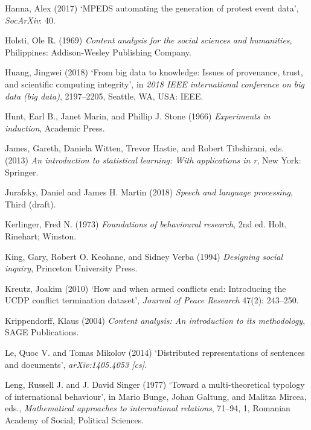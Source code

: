 \documentclass[12pt,twoside]{reedthesis}
\begin{document}
\hypertarget{ref-hanna_mpeds_2017}{}
Hanna, Alex (2017) `MPEDS automating the generation of protest event
data', \emph{SocArXiv}: 40.

\hypertarget{ref-holsti_content_1969}{}
Holsti, Ole R. (1969) \emph{Content analysis for the social sciences and
humanities}, Philippines: Addison-Wesley Publishing Company.

\hypertarget{ref-huang_big_2018}{}
Huang, Jingwei (2018) `From big data to knowledge: Issues of provenance,
trust, and scientific computing integrity', in \emph{2018 IEEE
international conference on big data (big data)}, 2197--2205, Seattle,
WA, USA: IEEE.

\hypertarget{ref-hunt_experiments_1966}{}
Hunt, Earl B., Janet Marin, and Phillip J. Stone (1966)
\emph{Experiments in induction}, Academic Press.

\hypertarget{ref-james_introduction_2013}{}
James, Gareth, Daniela Witten, Trevor Hastie, and Robert Tibshirani,
eds. (2013) \emph{An introduction to statistical learning: With
applications in r}, New York: Springer.

\hypertarget{ref-jurafsky_speech_2018}{}
Jurafsky, Daniel and James H. Martin (2018) \emph{Speech and language
processing}, Third (draft).

\hypertarget{ref-kerlinger_foundations_1973}{}
Kerlinger, Fred N. (1973) \emph{Foundations of behavioural research},
2nd ed. Holt, Rinehart; Winston.

\hypertarget{ref-king_designing_1994}{}
King, Gary, Robert O. Keohane, and Sidney Verba (1994) \emph{Designing
social inquiry}, Princeton University Press.

\hypertarget{ref-kreutz_how_2010}{}
Kreutz, Joakim (2010) `How and when armed conflicts end: Introducing the
UCDP conflict termination dataset', \emph{Journal of Peace Research}
47(2): 243--250.

\hypertarget{ref-krippendorff_content_2004}{}
Krippendorff, Klaus (2004) \emph{Content analysis: An introduction to
its methodology}, SAGE Publications.

\hypertarget{ref-le_distributed_2014}{}
Le, Quoc V. and Tomas Mikolov (2014) `Distributed representations of
sentences and documents', \emph{arXiv:1405.4053 {[}cs{]}}.

\hypertarget{ref-leng_toward_1977}{}
Leng, Russell J. and J. David Singer (1977) `Toward a multi-theoretical
typology of international behaviour', in Mario Bunge, Johan Galtung, and
Malitza Mircea, eds., \emph{Mathematical approaches to international
relations}, 71--94, 1, Romanian Academy of Social; Political Sciences.
\end{document}
